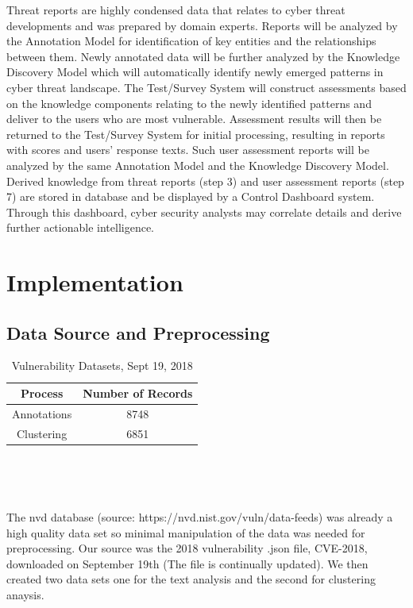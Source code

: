\documentclass{article} %
\begin{document}
Threat reports are highly condensed data that relates to cyber threat developments and was prepared by domain experts. Reports will be analyzed by the Annotation Model for identification of key entities and the relationships between them. Newly annotated data will be further analyzed by the Knowledge Discovery Model which will automatically identify newly emerged patterns in cyber threat landscape. The Test/Survey System will construct assessments based on the knowledge components relating to the newly identified patterns and deliver to the users who are most vulnerable. Assessment results will then be returned to the Test/Survey System for initial processing, resulting in reports with scores and users' response texts. Such user assessment reports will be analyzed by the same Annotation Model and the Knowledge Discovery Model. Derived knowledge from threat reports (step 3) and user assessment reports (step 7) are stored in database and be displayed by a Control Dashboard system. Through this dashboard, cyber security analysts may correlate details and derive further actionable intelligence.

\section{Implementation}
\subsection{Data Source and Preprocessing}


\begin{table}[h!]
\begin{center} 
\begin{tabular}{ |c|c|  } \hline
 Process & Number of Records \\ \hline
 Annotations & 8748  \\  \hline
 Clustering & 6851  \\   \hline
\end{tabular} \\
\label{table:1}
\end{center}
\label{table:1}
\caption{Vulnerability Datasets, Sept 19, 2018} \\
\end{table}

The nvd database (source:  https://nvd.nist.gov/vuln/data-feeds) was already a high quality data set so minimal manipulation of the data was needed for preprocessing. Our source was the 2018 vulnerability .json file, CVE-2018, downloaded on September 19th (The file is continually updated). We then created two data sets one for the text analysis and the second for clustering anaysis.  
\end{document}
